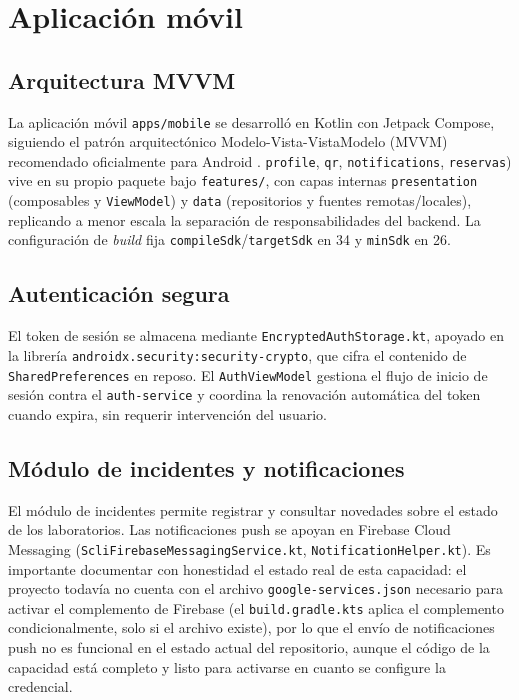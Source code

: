 \section{Aplicación móvil}
\label{sec:aplicacion-movil}

\subsection{Arquitectura MVVM}

La aplicación móvil \texttt{apps/mobile} se desarrolló en Kotlin con
Jetpack Compose, siguiendo el patrón arquitectónico Modelo-Vista-VistaModelo
(MVVM) recomendado oficialmente para Android \cite{android2024architecture}.
\texttt{profile}, \texttt{qr}, \texttt{notifications}, \texttt{reservas})
vive en su propio paquete bajo \texttt{features/}, con capas internas
\texttt{presentation} (composables y \texttt{ViewModel}) y \texttt{data}
(repositorios y fuentes remotas/locales), replicando a menor escala la
separación de responsabilidades del backend. La configuración de
\emph{build} fija \texttt{compileSdk}/\texttt{targetSdk} en 34 y
\texttt{minSdk} en 26.

\subsection{Autenticación segura}

El token de sesión se almacena mediante
\texttt{EncryptedAuthStorage.kt}, apoyado en la librería
\texttt{androidx.security:security-crypto}, que cifra el contenido de
\texttt{SharedPreferences} en reposo. El \texttt{AuthViewModel}
gestiona el flujo de inicio de sesión contra el
\texttt{auth-service} y coordina la renovación automática del token
cuando expira, sin requerir intervención del usuario.

\subsection{Módulo de incidentes y notificaciones}

El módulo de incidentes permite registrar y consultar novedades sobre
el estado de los laboratorios. Las notificaciones push se apoyan en
Firebase Cloud Messaging (\texttt{ScliFirebaseMessagingService.kt},
\texttt{NotificationHelper.kt}). Es importante documentar con
honestidad el estado real de esta capacidad: el proyecto todavía no
cuenta con el archivo \texttt{google-services.json} necesario para
activar el complemento de Firebase (el \texttt{build.gradle.kts}
aplica el complemento condicionalmente, solo si el archivo existe), por
lo que el envío de notificaciones push no es funcional en el estado
actual del repositorio, aunque el código de la capacidad está
completo y listo para activarse en cuanto se configure la credencial.

